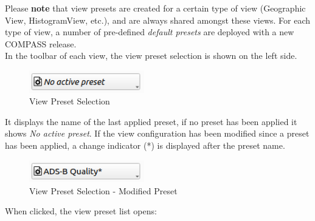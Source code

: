 Please \textbf{note} that view presets are created for a certain type of view (Geographic View, HistogramView, etc.),
and are always shared amongst these views. For each type of view, a number of pre-defined \textit{default presets} are deployed with a new COMPASS release. \\

In the toolbar of each view, the view preset selection is shown on the left side. 

\begin{figure}[H]
    \center
    \includegraphics[width=5cm]{figures/view_preset_selection.png}
  \caption{View Preset Selection}
\end{figure}

It displays the name of the last applied preset, if no preset has been applied it shows \textit{No active preset}.
If the view configuration has been modified since a preset has been applied, a change indicator (*) is displayed after the preset name.

\begin{figure}[H]
    \center
    \includegraphics[width=5cm]{figures/view_preset_selection_modified.png}
  \caption{View Preset Selection - Modified Preset}
\end{figure}

When clicked, the view preset list opens:

